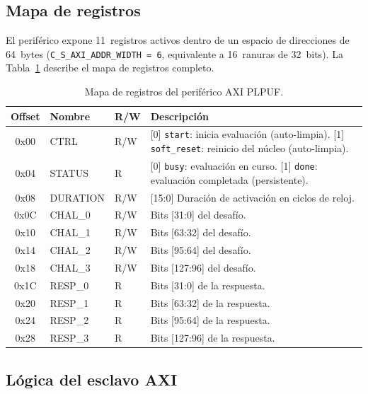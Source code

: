 \subsection{Mapa de registros}
\label{sec:regmap}

El periférico expone 11~registros activos dentro de un espacio de direcciones
de 64~bytes (\texttt{C\_S\_AXI\_ADDR\_WIDTH\,=\,6}, equivalente a
16~ranuras de 32~bits). La Tabla~\ref{tab:regmap} describe el mapa de
registros completo.

\begin{table}[htbp]
\centering
\caption{Mapa de registros del periférico AXI PLPUF.}
\label{tab:regmap}
\small
\begin{tabular}{cllp{6.5cm}}
\hline
\textbf{Offset} & \textbf{Nombre} & \textbf{R/W} & \textbf{Descripción} \\
\hline
0x00 & CTRL     & R/W & {[0]} \texttt{start}: inicia evaluación (auto-limpia). {[1]} \texttt{soft\_reset}: reinicio del núcleo (auto-limpia). \\
0x04 & STATUS   & R   & {[0]} \texttt{busy}: evaluación en curso. {[1]} \texttt{done}: evaluación completada (persistente). \\
0x08 & DURATION & R/W & {[15:0]} Duración de activación en ciclos de reloj. \\
0x0C & CHAL\_0  & R/W & Bits {[31:0]} del desafío. \\
0x10 & CHAL\_1  & R/W & Bits {[63:32]} del desafío. \\
0x14 & CHAL\_2  & R/W & Bits {[95:64]} del desafío. \\
0x18 & CHAL\_3  & R/W & Bits {[127:96]} del desafío. \\
0x1C & RESP\_0  & R   & Bits {[31:0]} de la respuesta. \\
0x20 & RESP\_1  & R   & Bits {[63:32]} de la respuesta. \\
0x24 & RESP\_2  & R   & Bits {[95:64]} de la respuesta. \\
0x28 & RESP\_3  & R   & Bits {[127:96]} de la respuesta. \\
\hline
\end{tabular}
\end{table}

\subsection{Lógica del esclavo AXI}
\label{sec:axi_logic}

